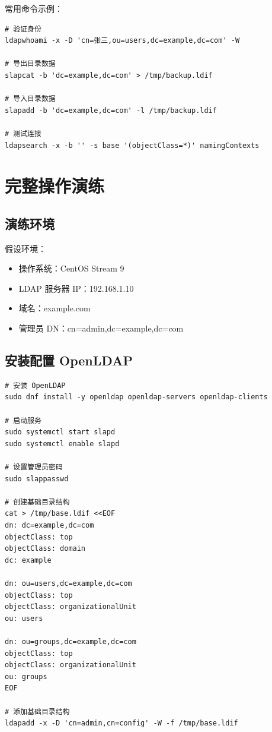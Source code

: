 \documentclass[12pt,UTF8]{ctexbook}
\begin{document}
常用命令示例：
\begin{verbatim}
# 验证身份
ldapwhoami -x -D 'cn=张三,ou=users,dc=example,dc=com' -W

# 导出目录数据
slapcat -b 'dc=example,dc=com' > /tmp/backup.ldif

# 导入目录数据
slapadd -b 'dc=example,dc=com' -l /tmp/backup.ldif

# 测试连接
ldapsearch -x -b '' -s base '(objectClass=*)' namingContexts
\end{verbatim}

\chapter{完整操作演练}
\label{chap:practice}

\section{演练环境}
\label{sec:practice_env}

假设环境：
\begin{itemize}
    \item 操作系统：CentOS Stream 9
    \item LDAP 服务器 IP：192.168.1.10
    \item 域名：example.com
    \item 管理员 DN：cn=admin,dc=example,dc=com
\end{itemize}

\section{安装配置 OpenLDAP}
\label{sec:practice_install}

\begin{verbatim}
# 安装 OpenLDAP
sudo dnf install -y openldap openldap-servers openldap-clients

# 启动服务
sudo systemctl start slapd
sudo systemctl enable slapd

# 设置管理员密码
sudo slappasswd

# 创建基础目录结构
cat > /tmp/base.ldif <<EOF
dn: dc=example,dc=com
objectClass: top
objectClass: domain
dc: example

dn: ou=users,dc=example,dc=com
objectClass: top
objectClass: organizationalUnit
ou: users

dn: ou=groups,dc=example,dc=com
objectClass: top
objectClass: organizationalUnit
ou: groups
EOF

# 添加基础目录结构
ldapadd -x -D 'cn=admin,cn=config' -W -f /tmp/base.ldif
\end{verbatim}
\end{document}
